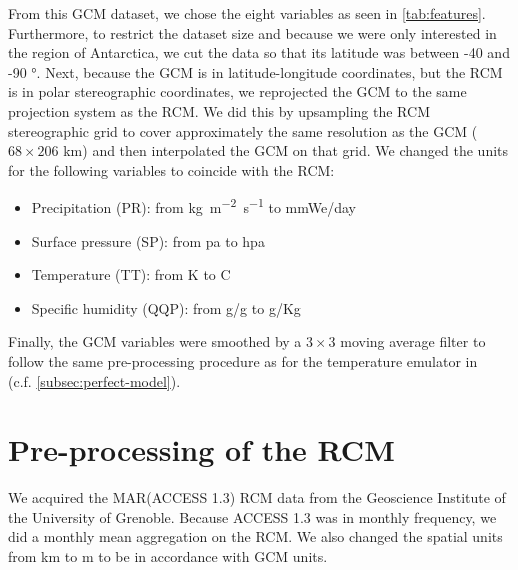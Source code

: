 \documentclass[a4paper,11pt,oneside]{report}
\begin{document}
From this GCM dataset, we chose the eight variables as seen in \autoref{tab:features}. Furthermore, to restrict the dataset size and because we were only interested in the region of Antarctica, we cut the data so that its latitude was between -40 and -90 $\si{\degree}$. Next, because the GCM is in latitude-longitude coordinates, but the RCM is in polar stereographic coordinates, we reprojected the GCM to the same projection system as the RCM. We did this by upsampling the RCM stereographic grid to cover approximately the same resolution as the GCM ($68 \times 206$ \si{km}) and then interpolated the GCM on that grid. We changed the units for the following variables to coincide with the RCM: 
\begin{itemize}
        \item Precipitation (PR): from \si{kg m^{-2}s^{-1}} to \si{mmWe/day}
        \item Surface pressure (SP): from \si{pa} to \si{hpa}
        \item Temperature (TT): from \si{K} to \si{C}
        \item Specific humidity (QQP): from \si{g/g} to \si{g/Kg}
    \end{itemize}
Finally, the GCM variables were smoothed by a $3\times3$ moving average filter to follow the same pre-processing procedure as for the temperature emulator in~\cite{Doury} (c.f. \autoref{subsec:perfect-model}). 


\section{Pre-processing of the RCM}\label{sec:preproc-RCM}
We acquired the MAR(ACCESS 1.3) RCM data from the Geoscience Institute of the University of Grenoble. Because ACCESS 1.3 was in monthly frequency, we did a monthly mean aggregation on the RCM. We also changed the spatial units from \si{km} to \si{m} to be in accordance with GCM units. 
\end{document}
